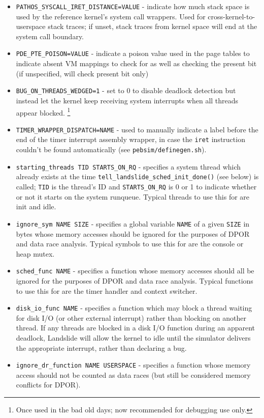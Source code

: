 \begin{itemize}
	\item {\tt PATHOS\_SYSCALL\_IRET\_DISTANCE=VALUE} - indicate how much stack space is used by the reference kernel's system call wrappers.
		Used for cross-kernel-to-userspace stack traces;
		if unset, stack traces from kernel space will end at the system call boundary.
	\item {\tt PDE\_PTE\_POISON=VALUE} - indicate a poison value used in the page tables to indicate absent VM mappings to check for as well as checking the present bit (if unspecified, will check present bit only)
	\item {\tt BUG\_ON\_THREADS\_WEDGED=1} - set to 0 to disable deadlock detection but instead let the kernel keep receiving system interrupts when all threads appear blocked.%
		\footnote{Once used in the bad old days; now recommended for debugging use only.}
	\item {\tt TIMER\_WRAPPER\_DISPATCH=NAME} - used to manually indicate a label before the end of the timer interrupt assembly wrapper, in case the {\tt iret} instruction couldn't be found automatically (see {\tt pebsim/definegen.sh}).
	\item {\tt starting\_threads TID STARTS\_ON\_RQ} - specifies a system thread which already exists at the time {\tt tell\_landslide\_sched\_init\_done()} (see below) is called; {\tt TID} is the thread's ID and {\tt STARTS\_ON\_RQ} is 0 or 1 to indicate whether or not it starts on the system runqueue.
		Typical threads to use this for are init and idle.
	\item {\tt ignore\_sym NAME SIZE} - specifies a global variable {\tt NAME} of a given {\tt SIZE} in bytes whose memory accesses should be ignored for the purposes of DPOR and data race analysis.
		Typical symbols to use this for are the console or heap mutex.
	\item {\tt sched\_func NAME} - specifies a function whose memory accesses should all be ignored for the purposes of DPOR and data race analysis.
		Typical functions to use this for are the timer handler and context switcher.
	\item {\tt disk\_io\_func NAME} - specifies a function which may block a thread waiting for disk I/O (or other external interrupt) rather than blocking on another thread.
		If any threads are blocked in a disk I/O function during an apparent deadlock,
		Landslide will allow the kernel to idle until the simulator delivers the appropriate interrupt,
		rather than declaring a bug.
	\item {\tt ignore\_dr\_function NAME USERSPACE} - specifies a function whose memory access should not be counted as data races (but still be considered memory conflicts for DPOR).

\end{itemize}
